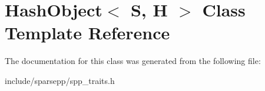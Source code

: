 \hypertarget{class_hash_object}{}\section{Hash\+Object$<$ S, H $>$ Class Template Reference}
\label{class_hash_object}


The documentation for this class was generated from the following file\+:\begin{DoxyCompactItemize}
\item 
include/sparsepp/spp\+\_\+traits.\+h\end{DoxyCompactItemize}
